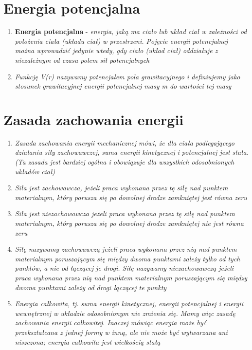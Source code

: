 \documentclass[12pt,twoside,a4paper]{book}
\begin{document}
\section{Energia potencjalna}
\begin{enumerate}[label=(\alph*)]
\item\textbf{Energia potencjalna} - \textit{energia, jaką ma ciało lub układ ciał w zależności od położenia ciała (układu ciał) w przestrzeni. Pojęcie energii potencjalnej można wprowadzić jedynie wtedy, gdy ciało (układ ciał) oddziałuje z niezależnym od czasu polem sił potencjalnych}
\item\textit{Funkcję V(r) nazywamy potencjałem pola grawitacyjnego i definiujemy jako
stosunek grawitacyjnej energii potencjalnej masy m do wartości tej masy}
\end{enumerate}

\section{Zasada zachowania energii}
\begin{enumerate}[label=(\alph*)]
\item\textit{Zasada zachowania energii mechanicznej mówi, że dla ciała podlegającego działaniu siły zachowawczej, suma energii kinetycznej i potencjalnej jest stała. (Ta zasada jest bardziej ogólna i obowiązuje dla wszystkich odosobnionych układów ciał)}
\item\textit{Siła jest zachowawcza, jeżeli praca wykonana przez tę siłę nad punktem
materialnym, który porusza się po dowolnej drodze zamkniętej jest równa zeru}
\item\textit{Siła jest niezachowawcza jeżeli praca wykonana przez tę siłę nad punktem
materialnym, który porusza się po dowolnej drodze zamkniętej nie jest równa zeru}
\item\textit{Siłę nazywamy zachowawczą jeżeli praca wykonana przez nią nad punktem materialnym poruszającym się między dwoma punktami zależy tylko od tych punktów, a nie od łączącej je drogi. Siłę nazywamy niezachowawczą jeżeli praca wykonana przez nią nad punktem materialnym poruszającym się między dwoma punktami zależy od drogi łączącej te punkty}
\item\textit{Energia całkowita, tj. suma energii kinetycznej, energii potencjalnej i energii
wewnętrznej w układzie odosobnionym nie zmienia się. Mamy więc zasadę
zachowania energii całkowitej. Inaczej mówiąc energia może być przekształcana
z jednej formy w inną, ale nie może być wytwarzana ani niszczona; energia
całkowita jest wielkością stałą}
\end{enumerate}
\end{document}
